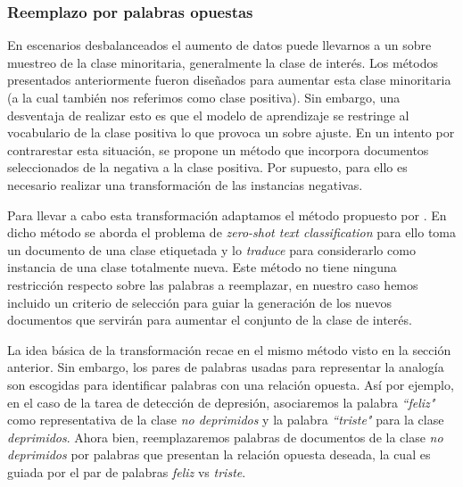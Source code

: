 \subsubsection{Reemplazo por palabras opuestas}


En escenarios desbalanceados el aumento de datos puede llevarnos a un sobre muestreo de la clase minoritaria,  generalmente la clase de interés. Los métodos presentados anteriormente fueron diseñados para aumentar esta clase minoritaria (a la cual también nos referimos como clase positiva). Sin embargo, una desventaja de realizar esto es que el modelo de aprendizaje se restringe al vocabulario de la clase positiva lo que provoca un sobre ajuste. En un intento por contrarestar esta situación, se propone un método que incorpora documentos seleccionados de la negativa a la clase positiva. Por supuesto, para ello es necesario realizar una transformación de las instancias negativas.

Para llevar a cabo esta transformación adaptamos el método propuesto por \citep{zhang2019integrating}. En dicho método se aborda el problema de  \textit{zero-shot text classification} para ello toma un documento de una clase etiquetada y lo \textit{traduce} para considerarlo como instancia de una clase totalmente nueva. Este método no tiene ninguna restricción respecto sobre las palabras a reemplazar, en nuestro caso hemos incluido un criterio de selección para guiar la generación de los nuevos  documentos que servirán para aumentar el conjunto de la clase de interés.   

La idea básica de la transformación recae en el mismo método visto en la sección anterior. Sin embargo, los pares de palabras usadas para representar la analogía son escogidas para identificar palabras con una relación opuesta. Así por ejemplo, en el caso de la tarea de detección de depresión, asociaremos la palabra \textit{``feliz"} como representativa de la clase \textit{no deprimidos}  y la palabra \textit{``triste"}  para la clase \textit{deprimidos}. Ahora bien, reemplazaremos palabras de documentos de la clase \textit{no deprimidos} por palabras que presentan la relación opuesta deseada, la cual es guiada por el par de palabras \textit{feliz} vs \textit{triste}. 



